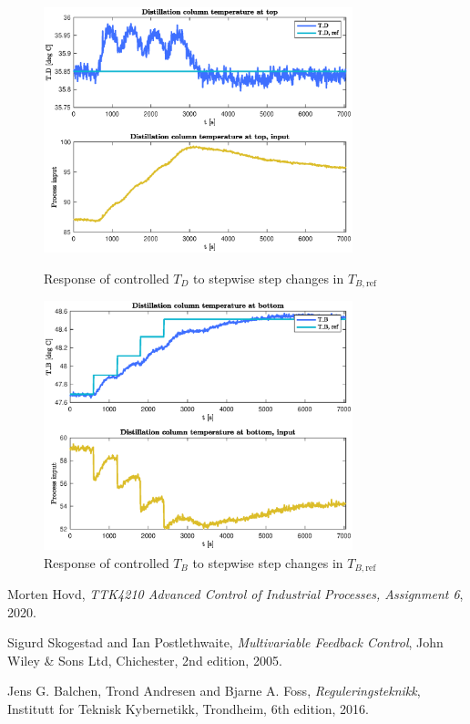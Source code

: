 \documentclass[12pt]{article}
\begin{document}
\begin{figure}[p]
\centering
\includegraphics[width=0.8\textwidth]{../Systemanalyse/Log_Data_to_Matlab/Figurer/LV_tuning/T_D_closed_loop_with_stepwise_T_B_step.eps}
\caption{Response of controlled $T_D$ to stepwise step changes in $T_{B, \textrm{ref}}$}
\label{fig:TD_TB_cl_stepwise}

\includegraphics[width=0.8\textwidth]{../Systemanalyse/Log_Data_to_Matlab/Figurer/LV_tuning/T_B_closed_loop_with_stepwise_T_B_step.eps}
\caption{Response of controlled $T_B$ to stepwise step changes in $T_{B, \textrm{ref}}$}
\label{fig:TB_TB_cl_stepwise}
\end{figure}


\newpage
\begin{thebibliography}{9}

  Morten Hovd,
  \textit{TTK4210 Advanced Control of Industrial Processes, Assignment 6},
  2020.

  Sigurd Skogestad and Ian Postlethwaite,
  \textit{Multivariable Feedback Control},
  John Wiley \& Sons Ltd, Chichester,
  2nd edition,
  2005.
  
  Jens G. Balchen, Trond Andresen and Bjarne A. Foss,
  \textit{Reguleringsteknikk},
  Institutt for Teknisk Kybernetikk, Trondheim,
  6th edition,
  2016.

\end{thebibliography}
\end{document}
